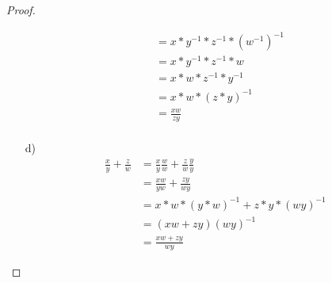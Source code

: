 \documentclass{exam}
\begin{document}
\begin{proof}
\begin{enumerate}
\begin{align*}
                                                  & = x*y^{-1} * z^{-1} * {(w^{-1})}^{-1} \\
                                                  & = x*y^{-1} * z^{-1} * w               \\
                                                  & = x * w * z^{-1} * y^{-1}             \\
                                                  & = x * w * {(z * y)}^{-1}              \\
                                                  & = \frac{xw}{zy}                       \\
              \end{align*}
        \item [d)]
              \begin{align*}
                  \frac{x}{y} + \frac{z}{w} & = \frac{x}{y}\frac{w}{w} + \frac{z}{w}\frac{y}{y} \\
                                            & = \frac{xw}{yw} + \frac{zy}{wy}                   \\
                                            & = x*w * {(y*w)}^{-1} + z*y*{(wy)}^{-1}            \\
                                            & = (xw + zy){(wy)}^{-1}                            \\
                                            & = \frac{xw+zy}{wy}
              \end{align*}
    \end{enumerate}
\end{proof}

\pagebreak
\end{document}
